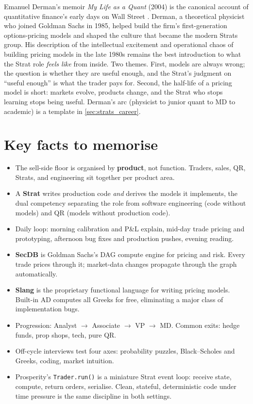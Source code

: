 \begin{historybox}
Emanuel Derman's memoir \emph{My Life as a Quant} (2004) is the
canonical account of quantitative finance's early days on Wall
Street \citeDerman{}.  Derman, a theoretical physicist who joined
Goldman Sachs in 1985, helped build the firm's first-generation
options-pricing models and shaped the culture that became the
modern Strats group.  His description of the intellectual
excitement and operational chaos of building pricing models
in the late 1980s remains the best introduction to what the Strat
role \emph{feels like} from inside.  Two themes.  First, models are
always wrong; the question is whether they are useful enough, and
the Strat's judgment on ``useful enough'' is what the trader pays
for.  Second, the half-life of a pricing model is short: markets
evolve, products change, and the Strat who stops learning stops
being useful.  Derman's arc (physicist to junior quant to MD to
academic) is a template in \cref{sec:strats_career}.
\end{historybox}

\section*{Key facts to memorise}
\label{sec:strats_key_facts}

\begin{itemize}
  \item The sell-side floor is organised by \textbf{product}, not
    function.  Traders, sales, QR, Strats, and engineering sit
    together per product area.
  \item A \textbf{Strat} writes production code \emph{and} derives
    the models it implements, the dual competency separating the
    role from software engineering (code without models) and QR
    (models without production code).
  \item Daily loop: morning calibration and P\&L explain, mid-day
    trade pricing and prototyping, afternoon bug fixes and
    production pushes, evening reading.
  \item \textbf{SecDB} is Goldman Sachs's DAG compute engine for
    pricing and risk.  Every trade prices through it; market-data
    changes propagate through the graph automatically.
  \item \textbf{Slang} is the proprietary functional language for
    writing pricing models.  Built-in AD computes all Greeks for
    free, eliminating a major class of implementation bugs.
  \item Progression: Analyst $\to$ Associate $\to$ VP $\to$ MD.
    Common exits: hedge funds, prop shops, tech, pure QR.
  \item Off-cycle interviews test four axes: probability puzzles,
    Black--Scholes and Greeks, coding, market intuition.
  \item Prosperity's \texttt{Trader.run()} is a miniature Strat
    event loop: receive state, compute, return orders, serialise.
    Clean, stateful, deterministic code under time pressure is the
    same discipline in both settings.
\end{itemize}
